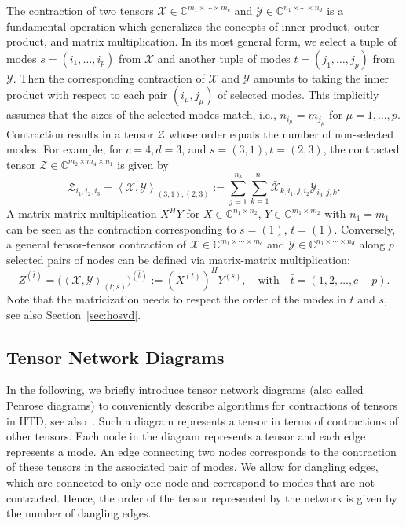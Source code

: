 \documentclass[11pt, a4paper]{article}
\newcommand{\calX}{\mathcal{X}}
\newcommand{\calY}{\mathcal{Y}}
\newcommand{\calZ}{\mathcal{Z}}
\newcommand{\C}{{\mathbb C}}
\newcommand{\innerprod}[2]{{\left\langle#1,#2\right\rangle}}
\begin{document}
The contraction of two tensors $\calX \in \C^{m_1 \times \cdots \times m_c}$ and $\calY \in
\C^{n_1 \times \cdots \times n_d}$ is a fundamental operation which generalizes the concepts
of inner product, outer product, and matrix multiplication.
In its most general form, we select a tuple of modes $s = (i_1, \ldots, i_p)$ from $\calX$
and another tuple of modes $t = (j_1, \ldots, j_p)$ from $\calY$.
Then the corresponding contraction of 
$\calX$ and $\calY$ amounts to taking the inner product with respect to each
pair $(i_\mu,j_\mu)$ of selected modes. This implicitly assumes that the sizes of the selected modes match, i.e.,
$n_{i_\mu} = m_{j_\mu}$ for $\mu = 1, \ldots, p$. Contraction results in
a tensor $\calZ$ whose order equals the number of non-selected modes.
For example, for $c = 4, d = 3$, and $s = (3,1), t = (2,3)$,
the contracted tensor $\calZ \in \C^{m_2 \times m_4 \times n_1}$
is given by
\begin{equation} \label{eq:contractionxy}
 \calZ_{i_1,i_2,i_3} = 
\innerprod{\calX}{\calY}_{(3, 1),(2, 3)} := \sum_{j=1}^{n_3}
\sum_{k=1}^{n_1} \bar{\calX}_{k,i_1,j,i_2} \calY_{i_3,j,k}.
\end{equation}
A matrix-matrix multiplication $X^H Y$ for $X \in \C^{n_1 \times
  n_2}$, $Y \in \C^{m_1 \times m_2}$ with $n_1 = m_1$ can be seen as
the contraction corresponding to $s = (1)$, $t = (1)$. Conversely, a
general tensor-tensor contraction of $\calX \in \C^{m_1 \times \cdots
  \times m_c}$ and $\calY \in \C^{n_1 \times \cdots \times n_d}$ along
$p$ selected pairs of nodes can be defined via matrix-matrix
multiplication:
\begin{equation} \label{eq:defcontraction}
Z^{(\bar{t})} =  \Big( \innerprod{\calX}{\calY}_{(t; s)} \Big)^{(\bar{t})} :=
(X^{(t)})^H Y^{(s)}, \quad \text{with} \quad \bar{t} = (1, 2, \ldots, c - p).
\end{equation}
Note that the matricization needs to respect the order of the modes in $t$ and $s$, see also Section~\ref{sec:hosvd}.

\subsection{Tensor Network Diagrams}

In the following, we briefly introduce tensor network diagrams (also called
Penrose diagrams)
to conveniently describe algorithms for contractions of tensors in HTD,
see also~\cite{HolRS10b,Huckle2013}. Such a diagram represents a tensor
in terms of contractions of other tensors. Each node in the diagram
represents a tensor and each edge 
represents a mode. An edge connecting two nodes corresponds to the contraction of these tensors
in the associated pair of modes. We allow for dangling edges, which are connected to
only one node and correspond to modes that are not contracted.
Hence, the order of the tensor represented by the network is given by the number of 
dangling edges.
\end{document}
